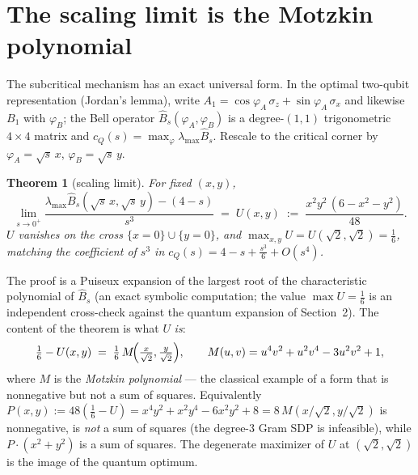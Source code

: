 \documentclass[11pt]{article}
\newtheorem{theorem}{Theorem}
\begin{document}
\section{The scaling limit is the Motzkin polynomial}\label{sec:motzkin}

The subcritical mechanism has an exact universal form. In the optimal
two-qubit representation (Jordan's lemma), write $A_1=\cos\varphi_A\,\sigma_z
+\sin\varphi_A\,\sigma_x$ and likewise $B_1$ with $\varphi_B$; the Bell
operator $\widehat B_s(\varphi_A,\varphi_B)$ is a degree-$(1,1)$ trigonometric
$4\times4$ matrix and $c_Q(s)=\max_{\varphi}\lambda_{\max}\widehat B_s$. Rescale
to the critical corner by $\varphi_A=\sqrt{s}\,x$, $\varphi_B=\sqrt{s}\,y$.

\begin{theorem}[scaling limit]\label{thm:scaling}
For fixed $(x,y)$,
\[
\lim_{s\to0^+}\frac{\lambda_{\max}\widehat B_s(\sqrt s\,x,\sqrt s\,y)-(4-s)}
{s^{3}}\;=\;U(x,y)\;:=\;\frac{x^2y^2\,(6-x^2-y^2)}{48}.
\]
$U$ vanishes on the cross $\{x=0\}\cup\{y=0\}$, and
$\max_{x,y}U=U(\sqrt2,\sqrt2)=\tfrac16$, matching the coefficient of $s^3$ in
$c_Q(s)=4-s+\tfrac{s^3}{6}+O(s^4)$.
\end{theorem}

The proof is a Puiseux expansion of the largest root of the characteristic
polynomial of $\widehat B_s$ (an exact symbolic computation; the value
$\max U=\tfrac16$ is an independent cross-check against the quantum expansion
of Section~2). The content of the theorem is what $U$ \emph{is}:
\[
\tfrac16-U(x,y)\;=\;\tfrac16\,M\!\Bigl(\tfrac{x}{\sqrt2},\tfrac{y}{\sqrt2}\Bigr),
\qquad
M(u,v)=u^4v^2+u^2v^4-3u^2v^2+1,
\]
where $M$ is the \emph{Motzkin polynomial} --- the classical example of a form
that is nonnegative but not a sum of squares. Equivalently
$P(x,y):=48(\tfrac16-U)=x^4y^2+x^2y^4-6x^2y^2+8=8\,M(x/\sqrt2,y/\sqrt2)$ is
nonnegative, is \emph{not} a sum of squares (the degree-$3$ Gram SDP is
infeasible), while $P\cdot(x^2+y^2)$ is a sum of squares. The degenerate
maximizer of $U$ at $(\sqrt2,\sqrt2)$ is the image of the quantum optimum.
\end{document}

